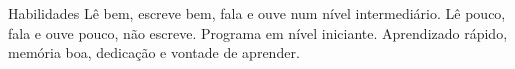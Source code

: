 
\begin{rubric}{Habilidades}
\entry*[Inglês]
	Lê bem, escreve bem, fala e ouve num nível intermediário.
\entry*[Japonês]
	Lê pouco, fala e ouve pouco, não escreve. 
	Programa em nível iniciante.
	Aprendizado rápido, memória boa, dedicação e vontade de aprender.
\end{rubric}

